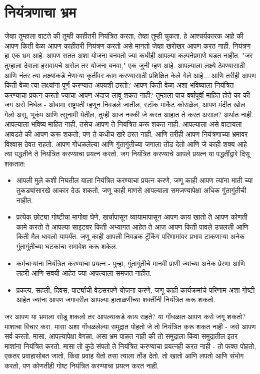\chapter{नियंत्रणाचा भ्रम}
जेव्हा तुम्हाला वाटते की तुम्ही काहीतरी नियंत्रित करता, तेव्हा तुम्ही चुकता.
हे आश्चर्यकारक आहे की आपण किती वेळा आपण काहीतरी नियंत्रण करतो असे मानतो जेव्हा खरोखर आपण करत नाही.
नियंत्रण हा एक भ्रम आहे.
आपण सतत अशा योजना बनवतो ज्या कधीही आपल्या कल्पनेप्रमाणे घडत नाहीत. "जर तुम्हाला देवाला हसवायचे असेल तर योजना बनवा," एक जुनी म्हण आहे.
आपल्याला लक्ष्ये ठेवण्यासाठी आणि नंतर त्या लक्ष्यांकडे नेणाऱ्या कृतींवर काम करण्यासाठी प्रशिक्षित केले गेले आहे... आणि तरीही आपण किती वेळा त्या लक्ष्यांना पूर्ण करण्यात अपयशी ठरतो? आपण किती वेळा अशा भविष्याला नियंत्रित करण्याचा प्रयत्न करतो ज्याचा आपण अंदाज लावू शकत नाही?
तुम्हाला पाच वर्षांपूर्वी माहित होते का की जग असे निघेल - ओबामा राष्ट्रपती म्हणून निवडले जातील, स्टॉक मार्केट कोसळेल, आपण मंदीत खोल गेलो असू, भूकंप आणि त्सुनामी येतील, तुम्ही आज नक्की जे करत आहात ते करत असाल?
अर्थात नाही. आपल्याला भविष्य माहित नाही, तसेच आपण ते नियंत्रित करू शकत नाही. आपल्याला असे वाटायला आवडते की आपण करू शकतो, पण ते कधीच खरे ठरत नाही.
आणि तरीही आपण नियंत्रणाच्या भ्रमावर विश्वास ठेवत राहतो. आपण गोंधळलेल्या आणि गुंतागुंतीच्या जगाला तोंड देतो आणि जे काही शक्य आहे त्या पद्धतीने ते नियंत्रित करण्याचा प्रयत्न करतो.
जग नियंत्रित करण्याचे आपले प्रयत्न या पद्धतींद्वारे दिसू शकतात:
\begin{itemize}
\item आपली मुले कशी निघतील याला नियंत्रित करण्याचा प्रयत्न करणे, जणू काही आपण त्यांना माती च्या तुकड्यांसारखे आकार देऊ शकतो, जणू काही माणसे आपल्याला समजण्यापेक्षा अधिक गुंतागुंतीची नाहीत.
\item प्रत्येक छोट्या गोष्टीचा मागोवा घेणे, खर्चापासून व्यायामापासून आपण काय खातो ते आपण कोणती कामे करतो ते आपल्या साइटवर किती अभ्यागत आहेत ते आज आपण किती पावले उचलली आणि किती मैल धावलो यापर्यंत. जणू काही आपली निवडक ट्रॅकिंग परिणामांवर प्रभाव टाकणाऱ्या अनेक गुंतागुंतीच्या घटकांचा समावेश करू शकेल.
\item कर्मचाऱ्यांना नियंत्रित करण्याचा प्रयत्न - पुन्हा, गुंतागुंतीचे मानवी प्राणी ज्यांच्या अनेक प्रेरणा आणि लहरी आणि सवयी आहेत ज्या आपल्याला समजत नाहीत.
\item प्रकल्प, सहली, दिवस, पार्ट्यांची वेडसरपणे योजना करणे, जणू काही कार्यक्रमांचे परिणाम अशा गोष्टी आहेत ज्यांना आपण जगावरील आपल्या हाताळणीच्या शक्तींनी नियंत्रित करू शकतो.
\end{itemize}
जर आपण या भ्रमाला सोडू शकलो तर आपल्याकडे काय राहते? या गोंधळात आपण कसे जगू शकतो?
माशाचा विचार करा. मासा अशा गोंधळलेल्या समुद्रात पोहतो जे तो नियंत्रित करू शकत नाही - जसे आपण सर्व करतो. मासा, आपल्यापेक्षा वेगळा, असा भ्रम पाळत नाही की तो समुद्राला किंवा समुद्रातील इतर माशांना नियंत्रित करतो. मासा तो कुठे संपतो ते नियंत्रित करण्याचा प्रयत्नही करत नाही - तो फक्त पोहतो, एकतर प्रवाहासोबत जातो, किंवा प्रवाह येतो तसा त्याला तोंड देतो. तो खातो आणि लपतो आणि संभोग करतो, पण कोणतीही गोष्ट नियंत्रित करण्याचा प्रयत्न करत नाही.
